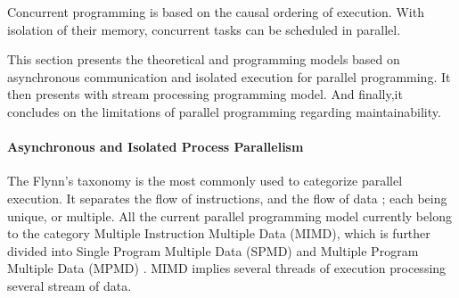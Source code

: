 Concurrent programming is based on the causal ordering of execution.
With isolation of their memory, concurrent tasks can be scheduled in parallel.

This section presents the theoretical and programming models based on asynchronous communication and isolated execution for parallel programming.
It then presents with stream processing programming model.
And finally,it concludes on the limitations of parallel programming regarding maintainability. 


\paragraph{Asynchronous and Isolated Process Parallelism}

The Flynn's taxonomy \cite{Flynn1972} is the most commonly used to categorize parallel execution.
It separates the flow of instructions, and the flow of data ; each being unique, or multiple.
All the current parallel programming model currently belong to the category Multiple Instruction Multiple Data (MIMD), which is further divided into Single Program Multiple Data (SPMD) \cite{Auguin1983,Darema1988,Darema2001} and Multiple Program Multiple Data (MPMD) \cite{Chang1997,Chan2004}.
MIMD implies several threads of execution processing several stream of data.

